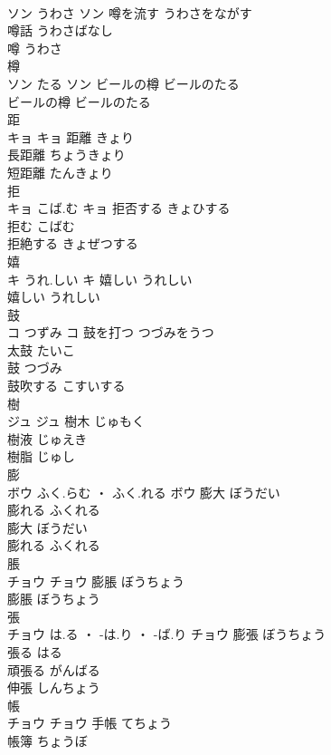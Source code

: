 \documentclass[8pt]{extreport}
\begin{document}
\begin{CJK}{UTF8}{min}
\\	ソン	うわさ	ソン	噂を流す	うわさをながす	
\\	噂話	うわさばなし	
\\	噂	うわさ	
\\	樽	
\\	ソン	たる	ソン	ビールの樽	ビールのたる	
\\	ビールの樽	ビールのたる	
\\	距	
\\	キョ		キョ	距離	きょり	
\\	長距離	ちょうきょり	
\\	短距離	たんきょり	
\\	拒	
\\	キョ	こば.む	キョ	拒否する	きょひする	
\\	拒む	こばむ	
\\	拒絶する	きょぜつする	
\\	嬉	
\\	キ	うれ.しい	キ	嬉しい	うれしい	
\\	嬉しい	うれしい	
\\	鼓	
\\	コ	つずみ	コ	鼓を打つ	つづみをうつ	
\\	太鼓	たいこ	
\\	鼓	つづみ	
\\	鼓吹する	こすいする	
\\	樹	
\\	ジュ		ジュ	樹木	じゅもく	
\\	樹液	じゅえき	
\\	樹脂	じゅし	
\\	膨	
\\	ボウ	ふく.らむ ・ ふく.れる	ボウ	膨大	ぼうだい	
\\	膨れる	ふくれる	
\\	膨大	ぼうだい	
\\	膨れる	ふくれる	
\\	脹	
\\	チョウ		チョウ	膨脹	ぼうちょう	
\\	膨脹	ぼうちょう	
\\	張	
\\	チョウ	は.る ・ -は.り ・ -ば.り	チョウ	膨張	ぼうちょう	
\\	張る	はる	
\\	頑張る	がんばる	
\\	伸張	しんちょう	
\\	帳	
\\	チョウ		チョウ	手帳	てちょう	
\\	帳簿	ちょうぼ	

\end{CJK}
\end{document}
